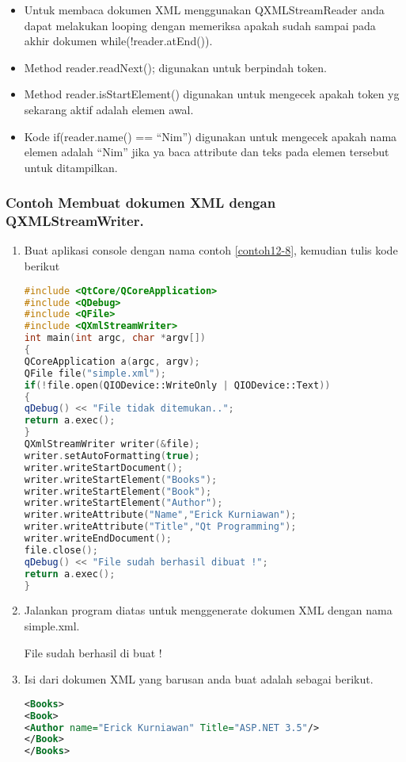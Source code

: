 \begin{itemize}

\item
  Untuk membaca dokumen XML menggunakan QXMLStreamReader anda dapat
  melakukan looping dengan memeriksa apakah sudah sampai pada akhir
  dokumen while(!reader.atEnd()).
\item
  Method reader.readNext(); digunakan untuk berpindah token.
\item
  Method reader.isStartElement() digunakan untuk mengecek apakah token
  yg sekarang aktif adalah elemen awal.
\item
  Kode if(reader.name() == ``Nim'') digunakan untuk mengecek apakah nama
  elemen adalah ``Nim'' jika ya baca attribute dan teks pada elemen
  tersebut untuk ditampilkan.
\end{itemize}

\subsubsection*{Contoh  Membuat dokumen XML dengan QXMLStreamWriter.}

\begin{enumerate}

\item
  Buat aplikasi console dengan nama contoh \ref{contoh12-8}, kemudian tulis kode
  berikut

\begin{lstlisting}[language=c++, caption=Membuat dokumen XML dengan QXMLStreamWriter, label=contoh12-9]
#include <QtCore/QCoreApplication>
#include <QDebug>
#include <QFile>
#include <QXmlStreamWriter>
int main(int argc, char *argv[])
{
QCoreApplication a(argc, argv);
QFile file("simple.xml");
if(!file.open(QIODevice::WriteOnly | QIODevice::Text))
{
qDebug() << "File tidak ditemukan..";
return a.exec();
}
QXmlStreamWriter writer(&file);
writer.setAutoFormatting(true);
writer.writeStartDocument();
writer.writeStartElement("Books");
writer.writeStartElement("Book");
writer.writeStartElement("Author");
writer.writeAttribute("Name","Erick Kurniawan");
writer.writeAttribute("Title","Qt Programming");
writer.writeEndDocument();
file.close();
qDebug() << "File sudah berhasil dibuat !";
return a.exec();
}
\end{lstlisting}
\item
  Jalankan program diatas untuk menggenerate dokumen XML dengan nama
  simple.xml.
  \begin{lcverbatim}
File sudah berhasil di buat !
  \end{lcverbatim}
\item
  Isi dari dokumen XML yang barusan anda buat adalah sebagai berikut.

\begin{lstlisting}[language=xml]
<Books>
<Book>
<Author name="Erick Kurniawan" Title="ASP.NET 3.5"/>
</Book>
</Books>
\end{lstlisting}

\end{enumerate}

